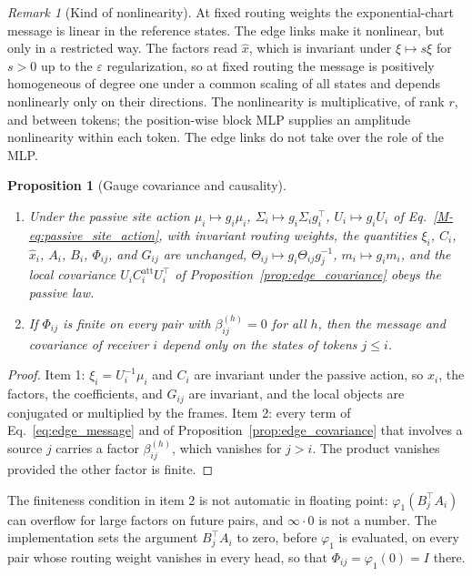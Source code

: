 \documentclass[11pt]{article}
\newtheorem{proposition}[theorem]{Proposition}
\theoremstyle{definition}
\theoremstyle{remark}
\newtheorem{remark}[theorem]{Remark}
\newcommand{\xh}{\hat x}
\newcommand{\Mref}[1]{\ref{M-#1}}
\begin{document}
\begin{remark}[Kind of nonlinearity]
\label{rem:nonlinearity}
At fixed routing weights the exponential-chart message is linear in the reference states. The edge links make it nonlinear, but only in a restricted way. The factors read $\xh$, which is invariant under $\xi\mapsto s\xi$ for $s>0$ up to the $\varepsilon$ regularization, so at fixed routing the message is positively homogeneous of degree one under a common scaling of all states and depends nonlinearly only on their directions. The nonlinearity is multiplicative, of rank $r$, and between tokens; the position-wise block MLP supplies an amplitude nonlinearity within each token. The edge links do not take over the role of the MLP.
\end{remark}

\begin{proposition}[Gauge covariance and causality]
\label{prop:edge_covariance_law}
\begin{enumerate}
\item Under the passive site action $\mu_i\mapsto g_i\mu_i$, $\Sigma_i\mapsto g_i\Sigma_ig_i^\top$, $U_i\mapsto g_iU_i$ of Eq.~\Mref{eq:passive_site_action}, with invariant routing weights, the quantities $\xi_i$, $C_i$, $\xh_i$, $A_i$, $B_i$, $\Phi_{ij}$, and $G_{ij}$ are unchanged, $\Theta_{ij}\mapsto g_i\Theta_{ij}g_j^{-1}$, $m_i\mapsto g_im_i$, and the local covariance $U_iC_i^{\mathrm{att}}U_i^\top$ of Proposition~\ref{prop:edge_covariance} obeys the passive law.
\item If $\Phi_{ij}$ is finite on every pair with $\beta_{ij}^{(h)}=0$ for all $h$, then the message and covariance of receiver $i$ depend only on the states of tokens $j\le i$.
\end{enumerate}
\end{proposition}
\begin{proof}
Item 1: $\xi_i=U_i^{-1}\mu_i$ and $C_i$ are invariant under the passive action, so $\xh_i$, the factors, the coefficients, and $G_{ij}$ are invariant, and the local objects are conjugated or multiplied by the frames. Item 2: every term of Eq.~\eqref{eq:edge_message} and of Proposition~\ref{prop:edge_covariance} that involves a source $j$ carries a factor $\beta_{ij}^{(h)}$, which vanishes for $j>i$. The product vanishes provided the other factor is finite.
\end{proof}

The finiteness condition in item 2 is not automatic in floating point: $\varphi_1(B_j^\top A_i)$ can overflow for large factors on future pairs, and $\infty\cdot0$ is not a number. The implementation sets the argument $B_j^\top A_i$ to zero, before $\varphi_1$ is evaluated, on every pair whose routing weight vanishes in every head, so that $\Phi_{ij}=\varphi_1(0)=I$ there.
\end{document}

